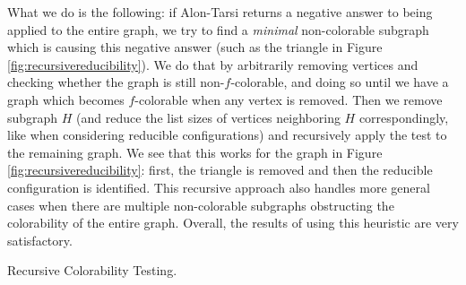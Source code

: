 What we do is the following: if Alon-Tarsi returns a negative answer to being applied to the 
entire graph, we try to find a \emph{minimal} non-colorable subgraph which is causing this 
negative answer (such 
as the triangle in Figure \ref{fig:recursivereducibility}). We do that by arbitrarily removing vertices
and checking whether the graph is still non-$f$-colorable, and doing so until we have a graph
which becomes $f$-colorable when any vertex is removed. Then we remove subgraph $H$ (and reduce
the list sizes of vertices neighboring $H$ correspondingly, like when considering reducible 
configurations) and recursively apply the test to the remaining graph. We see that this works for
the graph in Figure \ref{fig:recursivereducibility}: first, the triangle is removed and then the 
reducible configuration is identified. This recursive approach also handles more general cases
when there are multiple non-colorable subgraphs obstructing the colorability of the entire graph.
Overall, the results of using this heuristic are very satisfactory. 

\begin{algorithm}[H]
\caption{Recursive Colorability Testing.}
\SetAlgoLined
{}


\end{algorithm}

